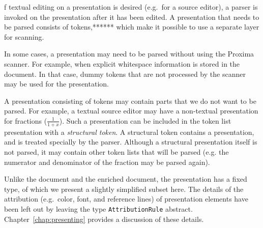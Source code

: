 \documentclass{speauth}
\begin{document}
\bc f textual editing on a presentation is desired (e.g.\ for a source editor), a parser is invoked on the presentation after it has been edited. A presentation that needs to be parsed consists of tokens,****** which make it possible to use a separate layer for scanning. \ec

\bc In some cases, a presentation may need to be parsed without using the Proxima scanner. For example, when explicit whitespace information is stored in the document. In that case, dummy tokens that are not processed by the scanner may be used for the presentation. \ec

A presentation consisting of tokens may contain parts that we do not want to be parsed. For example, a textual source editor may have a non-textual presentation for fractions ($\frac{1}{1+x}$). Such a presentation can be included in the token list presentation with a {\em structural token}. A structural token contains a presentation, and is treated specially by the parser. Although a structural presentation itself is not parsed, it may contain other token lists that will be parsed (e.g. the numerator and denominator of the fraction may be parsed again).

Unlike the document and the enriched document, the presentation has a fixed type, of which we present a slightly simplified subset here. The details of the attribution (e.g.\ color, font, and reference lines) of presentation elements have been left out by leaving the type \verb|AttributionRule| abstract. Chapter~\ref{chap:presenting} provides a discussion of these details. 
\end{document}
